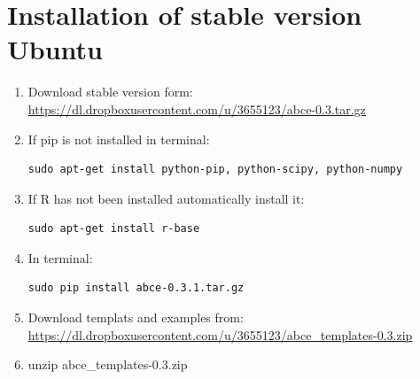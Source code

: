 \documentclass[letterpaper,10pt,english]{sphinxmanual}
\begin{document}
\section{Installation of stable version Ubuntu}
\label{installation:installation-of-stable-version-ubuntu}\begin{enumerate}
\item {} 
Download stable version form:  \href{https://dl.dropboxusercontent.com/u/3655123/abce-0.3.tar.gz}{https://dl.dropboxusercontent.com/u/3655123/abce-0.3.tar.gz}

\item {} 
If pip is not installed in terminal:

\begin{Verbatim}[commandchars=\\\{\}]
sudo apt-get install python-pip, python-scipy, python-numpy
\end{Verbatim}

\item {} 
If R has not been installed automatically install it:

\begin{Verbatim}[commandchars=\\\{\}]
sudo apt-get install r-base
\end{Verbatim}

\item {} 
In terminal:

\begin{Verbatim}[commandchars=\\\{\}]
sudo pip install abce-0.3.1.tar.gz
\end{Verbatim}

\item {} 
Download templats and examples from: \href{https://dl.dropboxusercontent.com/u/3655123/abce\_templates-0.3.zip}{https://dl.dropboxusercontent.com/u/3655123/abce\_templates-0.3.zip}

\item {} 
unzip abce\_templates-0.3.zip

\end{enumerate}
\end{document}
